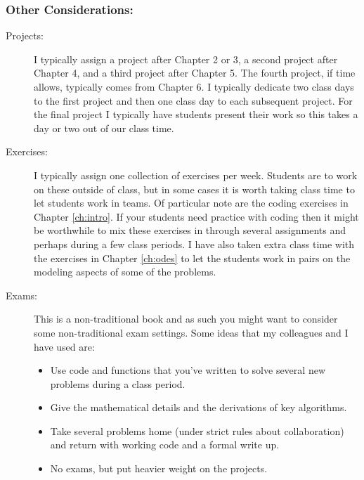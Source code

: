 \subsubsection*{Other Considerations:}
\begin{description}
    \item[Projects:] I typically assign a project after Chapter 2 or 3, a second project
        after Chapter 4, and a third project after Chapter 5.  The fourth project, if time
        allows, typically comes from Chapter 6.  I typically dedicate two class days to
        the first project and then one class day to each subsequent project. For the final
        project I typically have students present their work so this takes a day or two
        out of our class time. 
    \item[Exercises:] I typically assign one collection of exercises per week.  Students
        are to work on these outside of class, but in some
        cases it is worth taking class time to let students work in teams.  Of particular
        note are the coding exercises in Chapter \ref{ch:intro}.  If your students need
        practice with coding then it might be worthwhile to mix these exercises in through
        several assignments and perhaps during a few class periods.  I have also taken
        extra class time with the exercises in Chapter \ref{ch:odes} to let the students
        work in pairs on the modeling aspects of some of the problems.
    \item[Exams:] This is a non-traditional book and as such you might want to consider
        some non-traditional exam settings.  Some ideas that my colleagues and I have used
        are: 
        \begin{itemize}
            \item Use code and functions that you've written to solve several new
                problems during a class period.
            \item Give the mathematical details and the derivations of key algorithms.
            \item Take several problems home (under strict rules about collaboration) and
                return with working code and a formal write up.
            \item No exams, but put heavier weight on the projects.
        \end{itemize}
\end{description}

